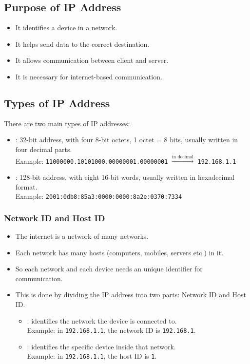 \subsection{Purpose of IP Address}

\begin{itemize}
    \item It identifies a device in a network.
    \item It helps send data to the correct destination.
    \item It allows communication between client and server.
    \item It is necessary for internet-based communication.
\end{itemize}

\subsection{Types of IP Address}

There are two main types of IP addresses:
\begin{itemize}
    \item {}: 32-bit address, with four 8-bit octets, 1 octet = 8 bits, usually written in four decimal parts.\\
          Example:  \texttt{11000000.10101000.00000001.00000001} $\xrightarrow{\text{in decimal}}$ \texttt{192.168.1.1}
    \item {}: 128-bit address, with eight 16-bit words, usually written in hexadecimal format.\\
          Example: \texttt{2001:0db8:85a3:0000:0000:8a2e:0370:7334}
\end{itemize}

\subsubsection{Network ID and Host ID}
\begin{itemize}
    \item The internet is a network of many networks.
    \item Each network has many hosts (computers, mobiles, servers etc.) in it.
    \item So each network and each device needs an unique identifier for communication.
    \item This is done by dividing the IP address into two parts: Network ID and Host ID.
        \begin{itemize}
            \item {}: identifies the network the device is connected to. \\
            Example: in \texttt{192.168.1.1}, the network ID is \texttt{192.168.1}.
            \item {}: identifies the specific device inside that network. \\
            Example: in \texttt{192.168.1.1}, the host ID is \texttt{1}.
        \end{itemize}
\end{itemize}

